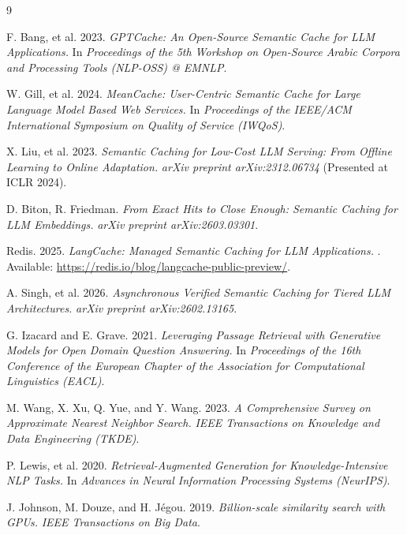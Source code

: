 \documentclass[sigconf]{acmart}
\begin{document}
\begin{thebibliography}{9}

F. Bang, et al. 2023.
\newblock \textit{GPTCache: An Open-Source Semantic Cache for LLM Applications.}
\newblock In \textit{Proceedings of the 5th Workshop on Open-Source Arabic Corpora and Processing Tools (NLP-OSS) @ EMNLP}.

W. Gill, et al. 2024.
\newblock \textit{MeanCache: User-Centric Semantic Cache for Large Language Model Based Web Services.}
\newblock In \textit{Proceedings of the IEEE/ACM International Symposium on Quality of Service (IWQoS)}.

X. Liu, et al. 2023.
\newblock \textit{Semantic Caching for Low-Cost LLM Serving: From Offline Learning to Online Adaptation.}
\newblock \textit{arXiv preprint arXiv:2312.06734} (Presented at ICLR 2024).

D. Biton, R. Friedman.
\newblock \textit{From Exact Hits to Close Enough: Semantic Caching for LLM Embeddings.}
\newblock \textit{arXiv preprint arXiv:2603.03301}.

Redis. 2025.
\newblock \textit{LangCache: Managed Semantic Caching for LLM Applications.}
\newblock [Online]. Available: \url{https://redis.io/blog/langcache-public-preview/}.

A. Singh, et al. 2026.
\newblock \textit{Asynchronous Verified Semantic Caching for Tiered LLM Architectures.}
\newblock \textit{arXiv preprint arXiv:2602.13165}.

G. Izacard and E. Grave. 2021.
\newblock \textit{Leveraging Passage Retrieval with Generative Models for Open Domain Question Answering.}
\newblock In \textit{Proceedings of the 16th Conference of the European Chapter of the Association for Computational Linguistics (EACL)}.

M. Wang, X. Xu, Q. Yue, and Y. Wang. 2023.
\newblock \textit{A Comprehensive Survey on Approximate Nearest Neighbor Search.}
\newblock \textit{IEEE Transactions on Knowledge and Data Engineering (TKDE)}.

P. Lewis, et al. 2020.
\newblock \textit{Retrieval-Augmented Generation for Knowledge-Intensive NLP Tasks.}
\newblock In \textit{Advances in Neural Information Processing Systems (NeurIPS)}.

J. Johnson, M. Douze, and H. Jégou. 2019.
\newblock \textit{Billion-scale similarity search with GPUs.}
\newblock \textit{IEEE Transactions on Big Data}.

\end{thebibliography}
\end{document}
